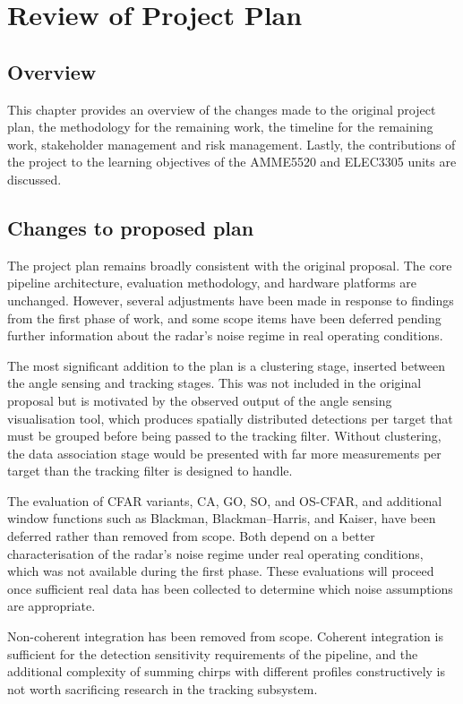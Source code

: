 \chapter{Review of Project Plan}
\section{Overview}
This chapter provides an overview of the changes made to the original project 
plan, the methodology for the remaining work, the timeline for the remaining 
work, stakeholder management and risk management. Lastly, 
the contributions of the project to the learning objectives of the AMME5520 and
ELEC3305 units are discussed.

\section{Changes to proposed plan}
The project plan remains broadly consistent with the original proposal. The core 
pipeline architecture, evaluation methodology, and hardware platforms are unchanged. 
However, several adjustments have been made in response to findings from the first 
phase of work, and some scope items have been deferred pending further information 
about the radar's noise regime in real operating conditions.

The most significant addition to the plan is a clustering stage, inserted between 
the angle sensing and tracking stages. This was not included in the original proposal 
but is motivated by the observed output of the angle sensing visualisation tool, 
which produces spatially distributed detections per target that must be grouped 
before being passed to the tracking filter. Without clustering, the data association 
stage would be presented with far more measurements per target than the tracking 
filter is designed to handle.

The evaluation of CFAR variants, CA, GO, SO, and OS-CFAR, and additional window 
functions such as Blackman, Blackman--Harris, and Kaiser, have been deferred 
rather than removed from scope. Both depend on a better characterisation of the 
radar's noise regime under real operating conditions, which was not available 
during the first phase. These evaluations will proceed once sufficient real data 
has been collected to determine which noise assumptions are appropriate.

Non-coherent integration has been removed from scope. Coherent integration is 
sufficient for the detection sensitivity requirements of the pipeline, and the 
additional complexity of summing chirps with different profiles constructively 
is not worth sacrificing research in the tracking subsystem.


